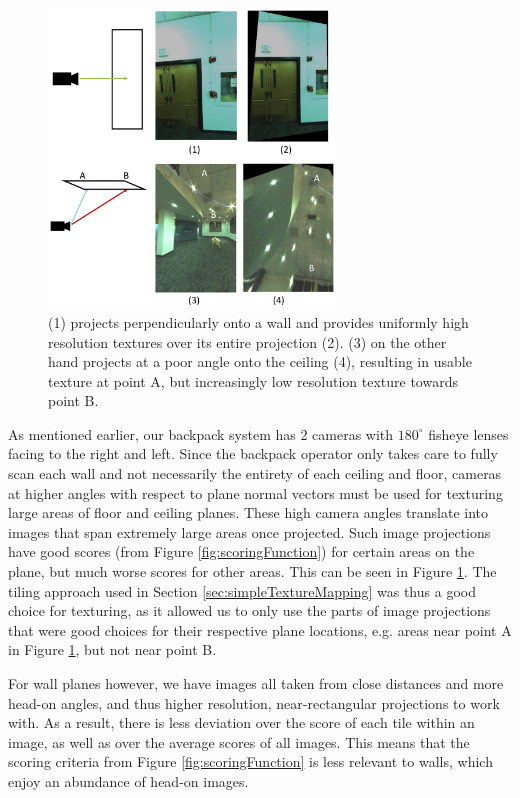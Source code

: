\documentclass[10pt,twocolumn,letterpaper]{article}
\begin{document}
\begin{figure}
  \centering
  \includegraphics[width=3in]{highCameraAngle.pdf}
  \caption{(1) projects perpendicularly onto a wall and provides
    uniformly high resolution textures over its entire projection
    (2). (3) on the other hand projects at a poor angle onto the
    ceiling (4), resulting in usable texture at point A, but
    increasingly low resolution texture towards point B.}
  \label{fig:highCameraAngle}
\end{figure}


As mentioned earlier, our backpack system has 2 cameras with
$180^\circ$ fisheye lenses facing to the right and left. Since the
backpack operator only takes care to fully scan each wall and not
necessarily the entirety of each ceiling and floor, cameras at higher
angles with respect to plane normal vectors must be used for texturing
large areas of floor and ceiling planes. These high camera angles
translate into images that span extremely large areas once
projected. Such image projections have good scores (from Figure
\ref{fig:scoringFunction}) for certain areas on the plane, but much
worse scores for other areas. This can be seen in Figure
\ref{fig:highCameraAngle}. The tiling approach used in Section
\ref{sec:simpleTextureMapping} was thus a good choice for texturing,
as it allowed us to only use the parts of image projections that were
good choices for their respective plane locations, e.g. areas near
point A in Figure \ref{fig:highCameraAngle}, but not near point B.

For wall planes however, we have images all taken from close distances
and more head-on angles, and thus higher resolution, near-rectangular
projections to work with. As a result, there is less deviation over
the score of each tile within an image, as well as over the average
scores of all images. This means that the scoring criteria from Figure
\ref{fig:scoringFunction} is less relevant to walls, which enjoy an
abundance of head-on images.
\end{document}

